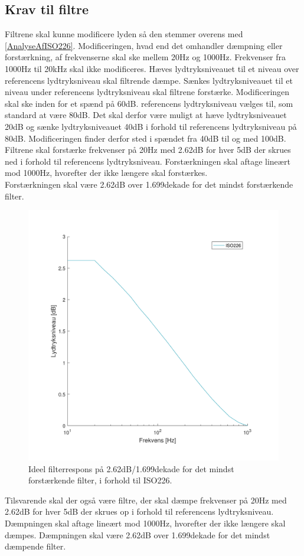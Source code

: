 \subsection{Krav til filtre}
\label{Systemkrav_Filtre}
%
Filtrene skal kunne modificere lyden så den stemmer overens med \autoref{AnalyseAfISO226}. Modificeringen, hvad end det omhandler dæmpning eller forstærkning, af frekvenserne skal ske mellem 20Hz og 1000Hz. Frekvenser fra 1000Hz til 20kHz skal ikke modificeres. Hæves lydtryksniveauet til et niveau over referencens lydtryksniveau skal filtrende dæmpe. Sænkes lydtryksniveauet til et niveau under referencens lydtryksniveau skal filtrene forstærke.
Modificeringen skal ske inden for et spænd på 60dB. referencens lydtryksniveau vælges til, som standard at være 80dB. Det skal derfor være muligt at hæve lydtryksniveauet 20dB og sænke lydtryksniveauet 40dB i forhold til referencens lydtryksniveau på 80dB. Modificeringen finder derfor sted i spændet fra 40dB til og med 100dB.\\    
Filtrene skal forstærke frekvenser på 20Hz med 2.62dB for hver 5dB der skrues ned i forhold til referencens lydtryksniveau. Forstærkningen skal aftage lineært mod 1000Hz, hvorefter der ikke længere skal forstærkes.\\
Forstærkningen skal være 2.62dB over 1.699dekade for det mindst forstærkende filter.
%
\begin{figure}[H]
	\centering
	\includegraphics[resolution=300,scale=0.7]{Figure/DesignAfFilter/IdeelFilterRespons}
	\caption{Ideel filterrespons på 2.62dB/1.699dekade for det mindst forstærkende filter, i forhold til ISO226.} 
	\label{fig:IdeelFilterRespons}
\end{figure}
\noindent
%
Tilsvarende skal der også være filtre, der skal dæmpe frekvenser på 20Hz med 2.62dB for hver 5dB der skrues op i forhold til referencens lydtryksniveau. Dæmpningen skal aftage lineært mod 1000Hz, hvorefter der ikke længere skal dæmpes. Dæmpningen skal være 2.62dB over 1.699dekade for det mindst dæmpende filter.

